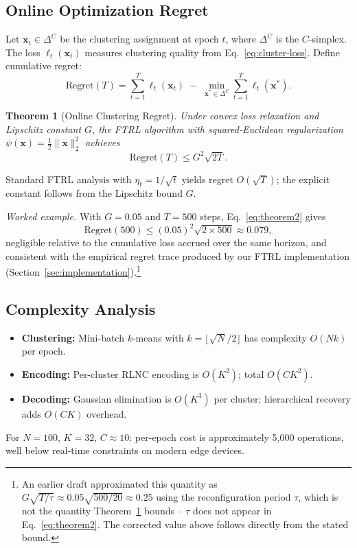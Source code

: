 \documentclass[journal]{IEEEtran}
\newtheorem{theorem}{Theorem}
\begin{document}
\subsection{Online Optimization Regret}
Let $\mathbf{x}_t \in \Delta^C$ be the clustering assignment at epoch $t$, where $\Delta^C$ is the $C$-simplex. The loss $\ell_t(\mathbf{x}_t)$ measures clustering quality from Eq.~\eqref{eq:cluster-loss}. Define cumulative regret:
\begin{equation}
\text{Regret}(T) = \sum_{t=1}^{T} \ell_t(\mathbf{x}_t) \;-\; \min_{\mathbf{x}^* \in \Delta^C} \sum_{t=1}^{T} \ell_t(\mathbf{x}^*).
\label{eq:regret-def}
\end{equation}

\begin{theorem}[Online Clustering Regret]
\label{thm:regret}
Under convex loss relaxation and Lipschitz constant $G$, the FTRL algorithm with squared-Euclidean regularization $\psi(\mathbf{x}) = \tfrac{1}{2}\|\mathbf{x}\|_2^2$ achieves
\begin{equation}
\text{Regret}(T) \leq G^2 \sqrt{2T}.
\label{eq:theorem2}
\end{equation}
\end{theorem}

\begin{IEEEproof}
Standard FTRL analysis \cite{hazan2016} with $\eta_t = 1/\sqrt{t}$ yields regret $O(\sqrt{T})$; the explicit constant follows from the Lipschitz bound $G$.
\end{IEEEproof}

\emph{Worked example.} With $G = 0.05$ and $T = 500$ steps, Eq.~\eqref{eq:theorem2} gives
\begin{equation}
\text{Regret}(500) \leq (0.05)^2 \sqrt{2 \times 500} \approx 0.079,
\end{equation}
negligible relative to the cumulative loss accrued over the same horizon, and consistent with the empirical regret trace produced by our FTRL implementation (Section~\ref{sec:implementation}).\footnote{An earlier draft approximated this quantity as $G\sqrt{T/\tau} \approx 0.05\sqrt{500/20} \approx 0.25$ using the reconfiguration period $\tau$, which is not the quantity Theorem~\ref{thm:regret} bounds -- $\tau$ does not appear in Eq.~\eqref{eq:theorem2}. The corrected value above follows directly from the stated bound.}

\subsection{Complexity Analysis}
\begin{itemize}
\item \textbf{Clustering:} Mini-batch $k$-means with $k = \lfloor \sqrt{N}/2 \rfloor$ has complexity $O(Nk)$ per epoch.
\item \textbf{Encoding:} Per-cluster RLNC encoding is $O(K^2)$; total $O(CK^2)$.
\item \textbf{Decoding:} Gaussian elimination is $O(K^3)$ per cluster; hierarchical recovery adds $O(CK)$ overhead.
\end{itemize}
For $N=100$, $K=32$, $C\approx10$: per-epoch cost is approximately 5{,}000 operations, well below real-time constraints on modern edge devices.
\end{document}

